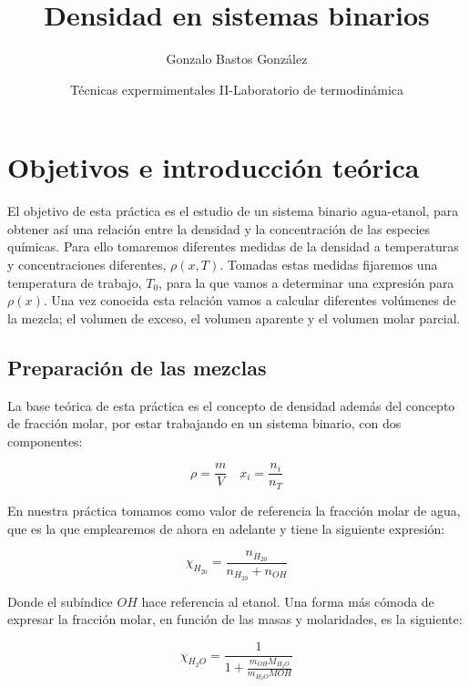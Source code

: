 \documentclass[a4paper,12pt,titlepage]{article}
\title{Densidad en sistemas binarios}
\author{Gonzalo Bastos González}
\date{Técnicas expermimentales II-Laboratorio de termodinámica}
\begin{document}
\maketitle
\tableofcontents

\newpage

\section{Objetivos e introducción teórica}

El objetivo de esta práctica es el estudio de un sistema binario agua-etanol, para obtener así una relación entre la densidad y la concentración de las especies químicas. Para ello tomaremos diferentes medidas de la densidad a temperaturas y concentraciones diferentes, $\rho(x,T)$. Tomadas estas medidas fijaremos una temperatura de trabajo, $T_0$, para la que vamos a determinar una expresión para $\rho(x)$. Una vez conocida esta relación vamos a calcular diferentes volúmenes de la mezcla; el volumen de exceso, el volumen aparente y el volumen molar parcial.

\subsection{Preparación de las mezclas}

La base teórica de esta práctica es el concepto de densidad además del concepto de fracción molar, por estar trabajando en un sistema binario, con dos componentes:

\begin{equation}
    \rho = \frac{m}{V} \quad x_i=\frac{n_i}{n_T}
\end{equation}

En nuestra práctica tomamos como valor de referencia la fracción molar de agua, que es la que emplearemos de ahora en adelante y tiene la siguiente expresión:

\begin{equation}
    \chi_{H_20} = \frac{n_{H_20}}{n_{H_20}+n_{OH}}
\end{equation}

Donde el subíndice $OH$ hace referencia al etanol. Una forma más cómoda de expresar la fracción molar, en función de las masas y molaridades, es la siguiente:

\begin{equation}
    \chi_{H_2O} = \frac{1}{1+\frac{m_{OH}M_{H_2O}}{m_{H_2O}M{OH}}}
    \label{x_agua}
\end{equation}
\end{document}
